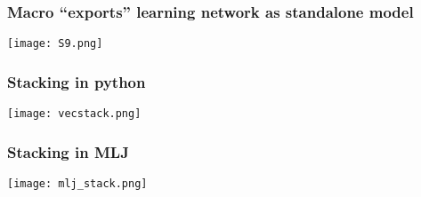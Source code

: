 \documentclass[t]{beamer}
\newcommand\df{\bf\color{Maroon}}
\begin{document}

\begin{frame}
  \frametitle{Macro ``exports'' learning network as standalone model}
    \begin{center}
    \texttt{[image: S9.png]}
  \end{center}
\end{frame}


\begin{frame}
  \frametitle{Stacking in python}
  \vspace{-\baselineskip}
  \begin{center}
    \texttt{[image: vecstack.png]}
  \end{center}
\end{frame}

\begin{frame}[plain]
  \frametitle{Stacking in MLJ}
  \vspace{-\baselineskip}
  \begin{center}
    \texttt{[image: mlj\_stack.png]}
  \end{center}
\end{frame}

\end{document}
